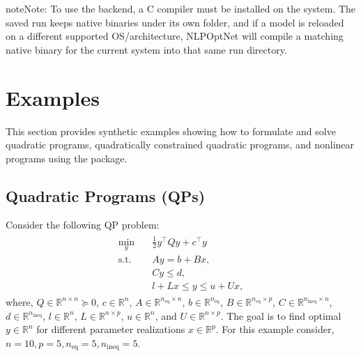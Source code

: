 \documentclass[letterpaper,10pt,english,openany,oneside]{sphinxmanual}
\begin{document}
\begin{sphinxadmonition}{note}{Note:}
\sphinxAtStartPar
To use the  backend, a C compiler must be installed on the system. The saved run keeps native binaries under its own  folder, and if a model is reloaded on a different supported OS/architecture, NLPOpt\sphinxhyphen{}Net will compile a matching native binary for the current system into that same run directory.
\end{sphinxadmonition}

\sphinxstepscope


\section{Examples}
\label{\detokenize{examples/index:examples}}\label{\detokenize{examples/index::doc}}
\sphinxAtStartPar
This section provides synthetic examples showing how to formulate and solve
quadratic programs, quadratically constrained quadratic programs, and nonlinear
programs using the package.

\sphinxstepscope


\subsection{Quadratic Programs (QPs)}
\label{\detokenize{examples/01_Example_QP:quadratic-programs-qps}}\label{\detokenize{examples/01_Example_QP::doc}}
\sphinxAtStartPar
Consider the following QP problem:
\begin{equation*}
\begin{split}\begin{aligned}
\min_{y} \quad & \frac{1}{2} y^\top Q y + c^\top y \\
\text{s.t.} \quad
& A y = b + B x, \\
& C y \leq d, \\
& l + L x \leq y \leq u + U x,
\end{aligned}\end{split}
\end{equation*}
\sphinxAtStartPar
where, \(Q\in\mathbb{R}^{n\times n}\succeq0\), \(c\in\mathbb{R}^n\), \(A\in\mathbb{R}^{n_\textrm{eq}\times n}\), \(b\in\mathbb{R}^{n_\textrm{eq}}\), \(B\in\mathbb{R}^{n_\textrm{eq}\times p}\), \(C\in\mathbb{R}^{n_\textrm{ineq}\times n}\), \(d\in\mathbb{R}^{n_\textrm{ineq}}\), \(l\in\mathbb{R}^n\), \(L\in\mathbb{R}^{n\times p}\), \(u\in\mathbb{R}^n\), and \(U\in\mathbb{R}^{n\times p}\). The goal is to find optimal \(y\in\mathbb{R}^n\) for different parameter realizations \(x\in\mathbb{R}^p\). For this example consider, \(n=10, p=5,n_\textrm{eq}=5,n_\textrm{ineq}=5\).
\end{document}
